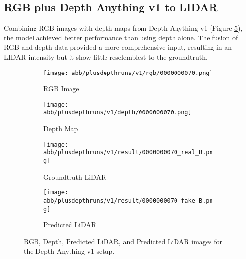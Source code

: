 \subsection{RGB plus Depth Anything v1 to LIDAR}
Combining RGB images with depth maps from Depth Anything v1 (Figure \ref{v1_rgbd}), the model achieved better performance than using depth alone. The fusion of RGB and depth data provided a more comprehensive input, resulting in an LIDAR intensity but it show little reselemblest to the groundtruth.
\begin{figure}[!ht]
	\centering
	\begin{subfigure}{0.4\textwidth}
		\centering
		\texttt{[image: abb/plusdepthruns/v1/rgb/0000000070.png]}
		\caption{RGB Image}
		\label{fig:v1_rgb}
	\end{subfigure}
	
	\vspace{1em} %
	
	\begin{subfigure}{0.4\textwidth}
		\centering
		\texttt{[image: abb/plusdepthruns/v1/depth/0000000070.png]}
		\caption{Depth Map}
		\label{fig:v1_depth}
	\end{subfigure}
	
	\vspace{1em} %
	
	\begin{subfigure}{0.25\textwidth}
		\centering
		\texttt{[image: abb/plusdepthruns/v1/result/0000000070\_real\_B.png]}
		\caption{Groundtruth LiDAR}
		\label{fig:v1_pred_lidar}
	\end{subfigure}
	\begin{subfigure}{0.25\textwidth}
		\centering
		\texttt{[image: abb/plusdepthruns/v1/result/0000000070\_fake\_B.png]}
		\caption{Predicted LiDAR}
		\label{fig:v1_fake_lidar}
	\end{subfigure}
	
	\caption{RGB, Depth, Predicted LiDAR, and Predicted LiDAR images for the Depth Anything v1 setup.}
	\label{v1_rgbd}
\end{figure}
\newpage
